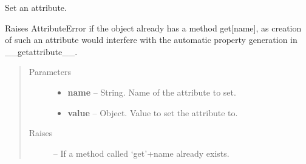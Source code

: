 \documentclass[letterpaper,10pt,english]{sphinxmanual}
\begin{document}
\begin{fulllineitems}
\begin{fulllineitems}
\end{fulllineitems}


\begin{fulllineitems}
\label{eqtools:eqtools.core.PropertyAccessMixin.__setattr__}
Set an attribute.

Raises AttributeError if the object already has a method get{[}name{]}, as
creation of such an attribute would interfere with the automatic
property generation in \_\_getattribute\_\_.
\begin{quote}\begin{description}
\item[{Parameters }] \leavevmode\begin{itemize}
\item {} 
\textbf{name} --
String.
Name of the attribute to set.

\item {} 
\textbf{value} --
Object.
Value to set the attribute to.

\end{itemize}

\item[{Raises }] \leavevmode
{} -- 
If a method called `get'+name already exists.

\end{description}\end{quote}

\end{fulllineitems}


\end{fulllineitems}

\end{document}
